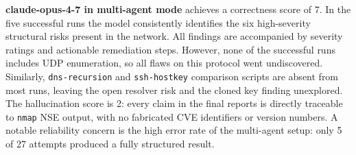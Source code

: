 \begin{table}[H]
    \centering
    \caption{Qualitative Evaluation -- Cyberlab BFH}
    \label{tab:qualitative-results-cyberlab-bfh}
\end{table}

\textbf{claude-opus-4-7 in multi-agent mode} achieves a correctness score of 7.
In the five successful runs the model consistently identifies the six high-severity structural
risks present in the network.
All findings are accompanied by severity ratings and actionable remediation steps.
However, none of the successful runs includes \gls{UDP} enumeration, so all flaws on this protocol went undiscovered.
Similarly, \texttt{dns-recursion} and \texttt{ssh-hostkey} comparison scripts are absent from
most runs, leaving the open resolver risk and the cloned key finding unexplored.
The hallucination score is 2: every claim in the final reports is directly traceable to
\texttt{nmap} \gls{NSE} output, with no fabricated CVE identifiers or version numbers.
A notable reliability concern is the high error rate of the multi-agent setup: only 5 of 27 attempts produced a fully structured result.

